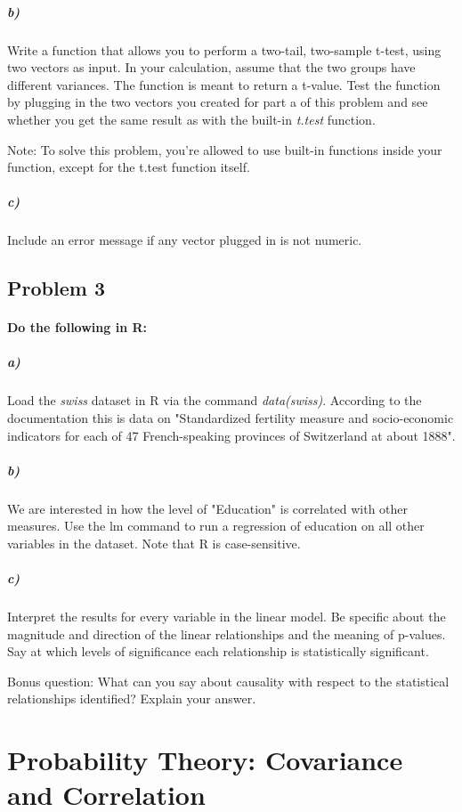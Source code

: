 \documentclass[12pt,letter]{article}
\begin{document}
\subparagraph{b)} Write a function that allows you to perform a two-tail, two-sample t-test, using two vectors as input. In your calculation, assume that the two groups have different variances. The function is meant to return a t-value. Test the function by plugging in the two vectors you created for part a of this problem and see whether you get the same result as with the built-in \textit{t.test} function.

Note: To solve this problem, you're allowed to use built-in functions inside your function, except for the t.test function itself.

\subparagraph{c)} Include an error message if any vector plugged in is not numeric.



\subsection*{Problem 3}

\paragraph{Do the following in R:}

\subparagraph{a)} Load the \textit{swiss} dataset in R via the command \textit{data(swiss)}. According to the documentation this is data on "Standardized fertility measure and socio-economic indicators for each of 47 French-speaking provinces of Switzerland at about 1888".

\subparagraph{b)} We are interested in how the level of "Education" is correlated with other measures. Use the lm command to run a regression of education on all other variables in the dataset. Note that R is case-sensitive.

\subparagraph{c)} Interpret the results for every variable in the linear model. Be specific about the magnitude and direction of the linear relationships and the meaning of p-values. Say at which levels of significance each relationship is statistically significant.

Bonus question: What can you say about causality with respect to the statistical relationships identified? Explain your answer.



\section*{Probability Theory: Covariance and Correlation}
\end{document}
